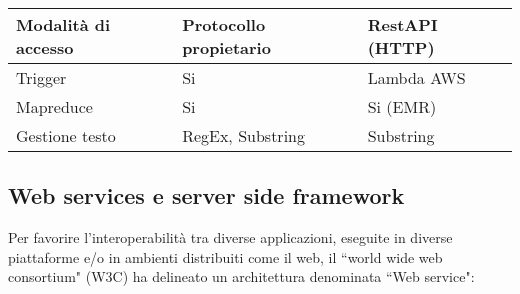 \begin{table}[htb]
\begin{tabular}{|l|l|l|}
Modalità di accesso & Protocollo propietario                                                                                                    & RestAPI (HTTP)                                                                                                              \\ \hline
Trigger             & Si                                                                                                                        & Lambda AWS                                                                                                                  \\ \hline
Mapreduce           & Si                                                                                                                        & Si (EMR)                                                                                                                    \\ \hline
Gestione testo      & RegEx, Substring                                                                                                          & Substring                                                                                                                   \\ \hline
\end{tabular}


\end{table}

\subsection{Web services e server side framework}
Per favorire l'interoperabilità tra diverse applicazioni, eseguite in diverse piattaforme e/o in ambienti distribuiti come il web, il ``world wide web consortium" (W3C) ha delineato un architettura denominata ``Web service": 

